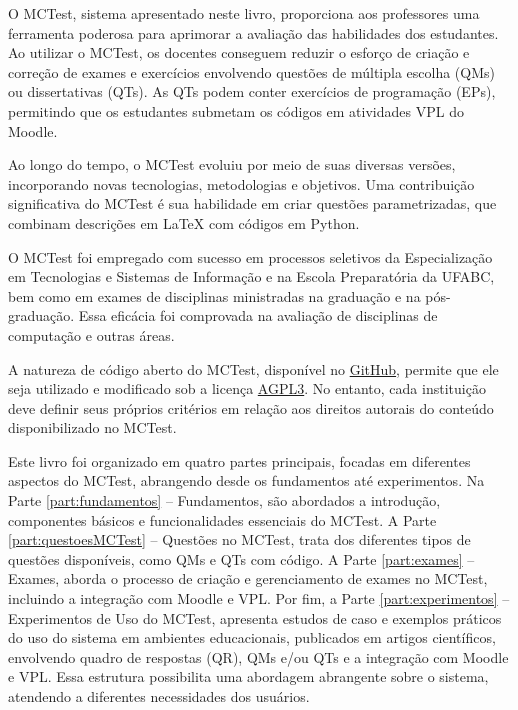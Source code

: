 \label{ch:conclusao}

O MCTest, sistema apresentado neste livro, proporciona aos professores uma ferramenta poderosa para aprimorar a avaliação das habilidades dos estudantes. Ao utilizar o MCTest, os docentes conseguem reduzir o esforço de criação e correção de exames e exercícios envolvendo questões de múltipla escolha (QMs) ou dissertativas (QTs). As QTs podem conter exercícios de programação (EPs), permitindo que os estudantes submetam os códigos em atividades VPL do Moodle.

Ao longo do tempo, o MCTest evoluiu por meio de suas diversas versões, incorporando novas tecnologias, metodologias e objetivos. Uma contribuição significativa do MCTest é sua habilidade em criar questões parametrizadas, que combinam descrições em \LaTeX{} com códigos em Python.

O MCTest foi empregado com sucesso em processos seletivos da Especialização em Tecnologias e Sistemas de Informação e na Escola Preparatória da UFABC, bem como em exames de disciplinas ministradas na graduação e na pós-graduação. Essa eficácia foi comprovada na avaliação de disciplinas de computação e outras áreas.

A natureza de código aberto do MCTest, disponível no \href{https://github.com/fzampirolli/mctest}{GitHub}, permite que ele seja utilizado e modificado sob a licença \href{https://www.gnu.org/licenses/agpl-3.0.html}{AGPL3}. No entanto, cada instituição deve definir seus próprios critérios em relação aos direitos autorais do conteúdo disponibilizado no MCTest.

Este livro foi organizado em quatro partes principais, focadas em diferentes aspectos do MCTest, abrangendo desde os fundamentos até experimentos. Na Parte \ref{part:fundamentos} -- Fundamentos, são abordados a introdução, componentes básicos e funcionalidades essenciais do MCTest. A Parte \ref{part:questoesMCTest} -- Questões no MCTest, trata dos diferentes tipos de questões disponíveis, como QMs e QTs com código. A Parte \ref{part:exames} -- Exames, aborda o processo de criação e gerenciamento de exames no MCTest, incluindo a integração com Moodle e VPL. Por fim, a Parte \ref{part:experimentos} -- Experimentos de Uso do MCTest, apresenta estudos de caso e exemplos práticos do uso do sistema em ambientes educacionais, publicados em artigos científicos, envolvendo quadro de respostas (QR), QMs e/ou QTs e a integração com Moodle e VPL. Essa estrutura possibilita uma abordagem abrangente sobre o sistema, atendendo a diferentes necessidades dos usuários.

